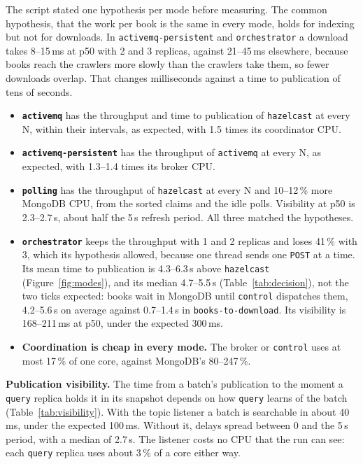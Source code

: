 \documentclass[11pt,a4paper]{article}
\newcommand{\code}[1]{\nolinkurl{#1}}
\newcommand{\mode}[1]{\code{#1}}
\begin{document}
The script stated one hypothesis per mode before measuring. The common hypothesis, that the work per book is the same
in every mode, holds for indexing but not for downloads. In \mode{activemq-persistent} and \mode{orchestrator} a
download takes 8--15\,ms at p50 with 2 and 3 replicas, against 21--45\,ms elsewhere, because books reach the crawlers
more slowly than the crawlers take them, so fewer downloads overlap. That changes milliseconds against a time to
publication of tens of seconds.

\begin{itemize}
\item \textbf{\mode{activemq}} has the throughput and time to publication of \mode{hazelcast} at every N, within
  their intervals, as expected, with 1.5 times its coordinator CPU.
\item \textbf{\mode{activemq-persistent}} has the throughput of \mode{activemq} at every N, as expected, with 1.3--1.4
  times its broker CPU.
\item \textbf{\mode{polling}} has the throughput of \mode{hazelcast} at every N and 10--12\,\% more MongoDB CPU, from
  the sorted claims and the idle polls. Visibility at p50 is 2.3--2.7\,s, about half the 5\,s refresh period. All three
  matched the hypotheses.
\item \textbf{\mode{orchestrator}} keeps the throughput with 1 and 2 replicas and loses 41\,\% with 3, which its
  hypothesis allowed, because one thread sends one \code{POST} at a time. Its mean time to publication is 4.3--6.3\,s
  above \mode{hazelcast} (Figure~\ref{fig:modes}), and its median 4.7--5.5\,s (Table~\ref{tab:decision}), not the two
  ticks expected: books wait in MongoDB until \code{control} dispatches them, 4.2--5.6\,s on average against
  0.7--1.4\,s in \code{books-to-download}. Its visibility is 168--211\,ms at p50, under the expected 300\,ms.
\item \textbf{Coordination is cheap in every mode.} The broker or \code{control} uses at most 17\,\% of one core,
  against MongoDB's 80--247\,\%.
\end{itemize}

\textbf{Publication visibility.} The time from a batch's publication to the moment a \code{query} replica holds it
in its snapshot depends on how \code{query} learns of the batch (Table~\ref{tab:visibility}). With the topic listener
a batch is searchable in about 40\,ms, under the expected 100\,ms. Without it, delays spread between 0 and the 5\,s
period, with a median of 2.7\,s. The listener costs no CPU that the run can see: each \code{query} replica uses about
3\,\% of a core either way.
\end{document}
